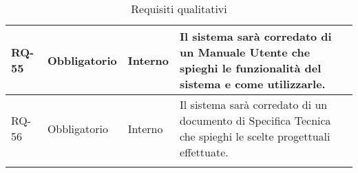 \begin{longtable}{|>{\centering\arraybackslash}m{}|>{\centering\arraybackslash}m{}|>{\centering\arraybackslash}m{}|>{\centering\arraybackslash}m{}|}
	\\\hline
	RQ-55           & Obbligatorio        & Interno                                                                                                                                                                                                                                              & Il sistema sarà corredato di un Manuale Utente che spieghi le funzionalità del sistema e come utilizzarle.
	\\\hline
	RQ-56           & Obbligatorio        & Interno                                                                                                                                                                                                                                              & Il sistema sarà corredato di un documento di Specifica Tecnica che spieghi le scelte progettuali effettuate.
	\\\hline
	\caption{Requisiti qualitativi}
\end{longtable}

\newpage

